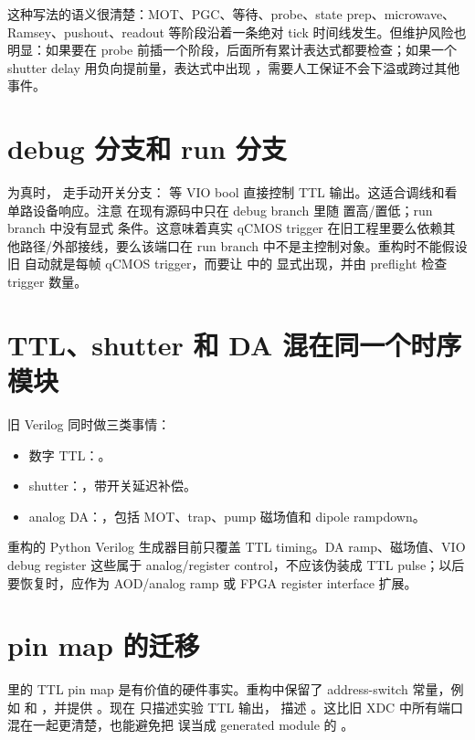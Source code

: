 \documentclass[11pt,oneside,openany]{book}
\begin{document}
这种写法的语义很清楚：MOT、PGC、等待、probe、state prep、microwave、Ramsey、pushout、readout 等阶段沿着一条绝对 tick 时间线发生。但维护风险也明显：如果要在 probe 前插一个阶段，后面所有累计表达式都要检查；如果一个 shutter delay 用负向提前量，表达式中出现 ，需要人工保证不会下溢或跨过其他事件。

\section{debug 分支和 run 分支}
 为真时， 走手动开关分支： 等 VIO bool 直接控制 TTL 输出。这适合调线和看单路设备响应。注意  在现有源码中只在 debug branch 里随  置高/置低；run branch 中没有显式  条件。这意味着真实 qCMOS trigger 在旧工程里要么依赖其他路径/外部接线，要么该端口在 run branch 中不是主控制对象。重构时不能假设旧  自动就是每帧 qCMOS trigger，而要让  中的  显式出现，并由 preflight 检查 trigger 数量。

\section{TTL、shutter 和 DA 混在同一个时序模块}
旧 Verilog 同时做三类事情：
\begin{itemize}
  \item 数字 TTL：。
  \item shutter：，带开关延迟补偿。
  \item analog DA：，包括 MOT、trap、pump 磁场值和 dipole rampdown。
\end{itemize}
重构的 Python Verilog 生成器目前只覆盖 TTL timing。DA ramp、磁场值、VIO debug register 这些属于 analog/register control，不应该伪装成 TTL pulse；以后要恢复时，应作为 AOD/analog ramp 或 FPGA register interface 扩展。

\section{pin map 的迁移}
 里的 TTL pin map 是有价值的硬件事实。重构中保留了 address-switch 常量，例如  和 ，并提供 。现在  只描述实验 TTL 输出， 描述 。这比旧 XDC 中所有端口混在一起更清楚，也能避免把  误当成 generated module 的 。
\end{document}
